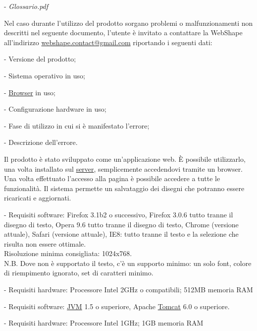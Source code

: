 \begin{elencopuntato}[\normindent]
	\item[-] \textit{Glossario.pdf}
\end{elencopuntato}

Nel caso durante l'utilizzo del prodotto sorgano problemi o malfunzionamenti non descritti nel seguente documento, l'utente \`e invitato a contattare la WebShape all'indirizzo \href{mailto:webshape.contact@gmail.com}{webshape.contact@gmail.com} riportando i seguenti dati:\\
\begin{elencopuntato}[\normindent]
	\item[-] Versione del prodotto;
	\item[-] Sistema operativo in uso;
	\item[-] \underline{Browser} in uso;
	\item[-] Configurazione hardware in uso;
	\item[-] Fase di utilizzo in cui si \`e manifestato l'errore;
	\item[-] Descrizione dell'errore.
\end{elencopuntato}


Il prodotto \`e stato sviluppato come un'applicazione web. \`E possibile utilizzarlo, una volta installato sul \underline{server}, semplicemente accedendovi tramite un browser. Una volta effettuato l'accesso alla pagina \`e possibile accedere a tutte le
funzionalit\`a. Il sistema permette un salvataggio dei disegni che potranno essere ricaricati e aggiornati.

\begin{elencopuntato}[\normindent]
    \item[-] Requisiti software: Firefox 3.1b2 o successivo, Firefox 3.0.6 tutto tranne il disegno di testo, Opera 9.6 tutto tranne il disegno di testo, Chrome (versione attuale), Safari (versione attuale), IE8: tutto tranne il testo e la selezione che risulta non essere ottimale.\\
    Risoluzione minima consigliata: 1024x768.\\
N.B. Dove non \`e supportato il testo, c'\`e un supporto minimo: un solo font, colore di riempimento ignorato, set di caratteri minimo. 
    \item[-] Requisiti hardware:  Processore Intel 2GHz o compatibili; 512MB memoria RAM 
\end{elencopuntato}
\begin{elencopuntato}[\normindent]
    \item[-] Requisiti software:  \underline{JVM} 1.5 o superiore, Apache \underline{Tomcat} 6.0 o superiore.
    \item[-] Requisiti hardware:  Processore Intel 1GHz; 1GB memoria RAM
\end{elencopuntato}

